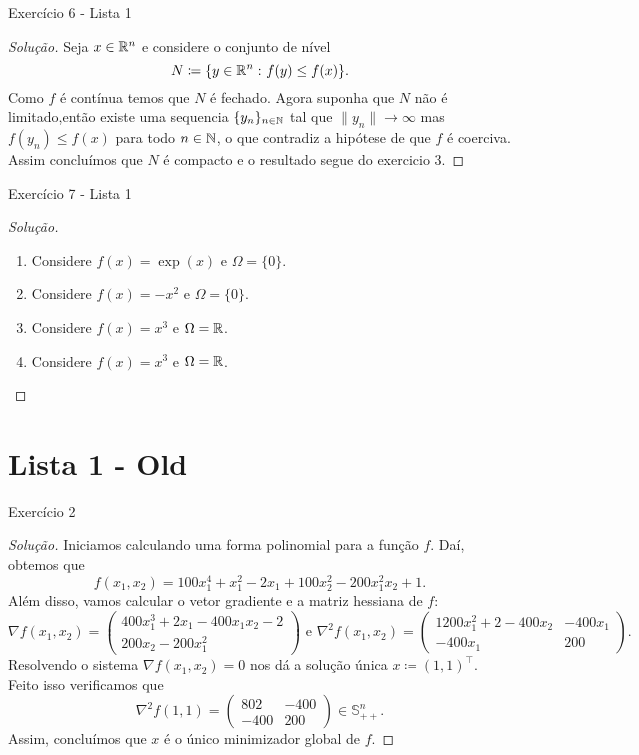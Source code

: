 \documentclass[12pt,twoside,a4paper]{article}
\begin{document}
\begin{problema}
Exercício 6 - Lista 1  
\end{problema}
\begin{proof}[Solução]
  Seja \(x\in\mathbb{R}^n\) e considere o conjunto de nível
  \[N\coloneqq\{y\in\mathbb{R}^n\,\colon f(y)\leq f(x)\}.\]
Como \(f\) é contínua temos que \(N\) é fechado. Agora suponha que
\(N\) não é limitado,então existe uma sequencia \(\{y_n\}_{n\in\mathbb{N}}\)
tal que \(\|y_n\|\rightarrow\infty\) mas \(f(y_n)\leq f(x)\) para
todo \(n\in\mathbb{N}\), o que contradiz a hipótese de que
\(f\) é coerciva. Assim concluímos que \(N\) é compacto e
o resultado segue do exercicio 3.
\end{proof}

\begin{problema}
Exercício 7 - Lista 1
\end{problema}
\begin{proof}[Solução]\hfill
  \begin{enumerate}
\item Considere \(f(x)=\exp(x)\) e \(\Omega=\{0\}\).
\item Considere \(f(x)=-x^2\) e \(\Omega=\{0\}\).
\item Considere \(f(x)=x^3\) e \(\Omega=\mathbb{R}\).
\item Considere \(f(x)=x^3\) e \(\Omega=\mathbb{R}\).
\end{enumerate}
\end{proof}
\section{Lista 1 - Old}
\begin{problema}\label{rosenmin}
Exercício 2
\end{problema}
\begin{proof}[Solução]
  Iniciamos calculando uma forma polinomial para a função \(f\).
  Daí, obtemos que
  \begin{equation}\label{rosenfunc}
   f(x_1,x_2)=100x_1^4+x_1^2-2x_1+100x_2^2-200x_1^2x_2+1. 
  \end{equation}
   Além disso, vamos calcular o vetor gradiente e a matriz hessiana de \(f\):
\begin{equation}\label{gradrosen}
  \nabla f(x_1,x_2)=\begin{pmatrix}
    400x_1^3 + 2x_1-400x_1x_2 -2 \\
    200 x_2 - 200x_1^2
  \end{pmatrix}
  \text{ e } \nabla^2 f(x_1,x_2)=\begin{pmatrix}
    1200x_1^2+2-400x_2 & -400x_1 \\
    -400x_1 & 200
    \end{pmatrix}.
\end{equation}
Resolvendo o sistema \(\nabla f(x_1,x_2)=0\) nos dá a solução única
\(x\coloneqq(1,1)^\top\). Feito isso verificamos que
\[\nabla^2f(1,1)=\begin{pmatrix}
    802 & -400 \\
    -400 & 200 \end{pmatrix}\in\mathbb{S}^n_{++}.\]
Assim, concluímos que \(x\) é o único minimizador global de \(f\).
\end{proof}
\end{document}
